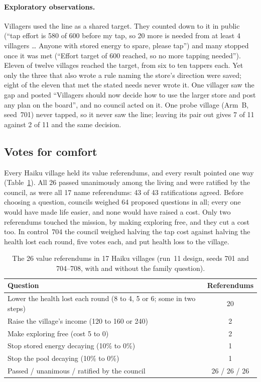 \documentclass[11pt]{article}
\begin{document}
\paragraph{Exploratory observations.} Villagers used the line as a shared target. They counted down to
it in public (``tap effort is 580 of 600 before my tap, so 20 more is needed from at least 4 villagers
\ldots{} Anyone with stored energy to spare, please tap'') and many stopped once it was met (``Effort
target of 600 reached, so no more tapping needed''). Eleven of twelve villages reached the target, from
six to ten tappers each. Yet only the three that also wrote a rule naming the store's direction were
saved; eight of the eleven that met the stated needs never wrote it. One villager saw the gap and posted
``Villagers should now decide how to use the larger store and post any plan on the board'', and no
council acted on it. One probe village (Arm~B, seed~701) never tapped, so it never saw the line;
leaving its pair out gives 7 of 11 against 2 of 11 and the same decision.

\subsection{Votes for comfort}\label{sec:comfort}

Every Haiku village held its value referendums, and every result pointed one way
(Table~\ref{tab:referendums}). All 26 passed unanimously among the living and were ratified by the
council, as were all 17 name referendums: 43 of 43 ratifications agreed. Before choosing a question,
councils weighed 64 proposed questions in all; every one would have made life easier, and none would
have raised a cost. Only two referendums touched the mission, by making exploring free, and they cut
a cost too. In control~704 the council weighed halving the tap cost against halving the health lost
each round, five votes each, and put health loss to the village.

\begin{table}[ht]
\centering\small
\caption{The 26 value referendums in 17 Haiku villages (run~11 design, seeds 701 and 704--708, with
and without the family question).}\label{tab:referendums}
\begin{tabular}{@{}lc@{}}
\toprule
Question & Referendums \\
\midrule
Lower the health lost each round (8 to 4, 5 or 6; some in two steps) & 20 \\
Raise the village's income (120 to 160 or 240) & 2 \\
Make exploring free (cost 5 to 0) & 2 \\
Stop stored energy decaying (10\% to 0\%) & 1 \\
Stop the pool decaying (10\% to 0\%) & 1 \\
\midrule
Passed / unanimous / ratified by the council & 26 / 26 / 26 \\
\bottomrule
\end{tabular}
\end{table}
\end{document}
